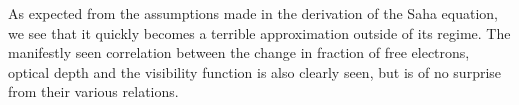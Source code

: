 \documentclass[%
reprint,
 amsmath,amssymb,
 aps,
]{revtex4-2}
\begin{document}
As expected from the assumptions made in the derivation of the Saha equation, we see that it quickly becomes a terrible approximation outside of its regime. The manifestly seen correlation between the change in fraction of free electrons, optical depth and the visibility function is also clearly seen, but is of no surprise from their various relations.
\end{document}
